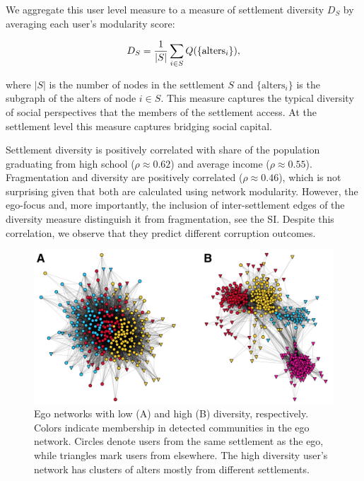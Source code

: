 We aggregate this user level measure to a measure of settlement diversity $D_{S}$ by averaging each user's modularity score:

\begin{equation*}
D_S={1\over{|S|}}\sum_{i \in S}Q(\{\textrm{alters}_i\}),
\label{eq:diversity}
\end{equation*}


\noindent where $|S|$ is the number of nodes in the settlement $S$ and $\{\textrm{alters}_i\}$ is the subgraph of the alters of node $i\in S$. This measure captures the typical diversity of social perspectives that the members of the settlement access. At the settlement level this measure captures bridging social capital.

Settlement diversity is positively correlated with share of the population graduating from high school ($\rho\approx0.62$) and average income ($\rho \approx0.55$). Fragmentation and diversity are positively correlated ($\rho \approx 0.46$), which is not surprising given that both are calculated using network modularity. However, the ego-focus and, more importantly, the inclusion of inter-settlement edges of the diversity measure distinguish it from fragmentation, see the SI. Despite this correlation, we observe that they predict different corruption outcomes.

\begin{figure}[t]
\centering
  \includegraphics[width=.9\textwidth]{images/iwiw/combodiv_cities.pdf}
  \caption[High and low diversity ego networks.]{Ego networks with low (A) and high (B) diversity, respectively. Colors indicate membership in detected communities in the ego network. Circles denote users from the same settlement as the ego, while triangles mark users from elsewhere. The high diversity user's network has clusters of alters mostly from different settlements.}
  \label{fig:ego_nets}
\end{figure}

